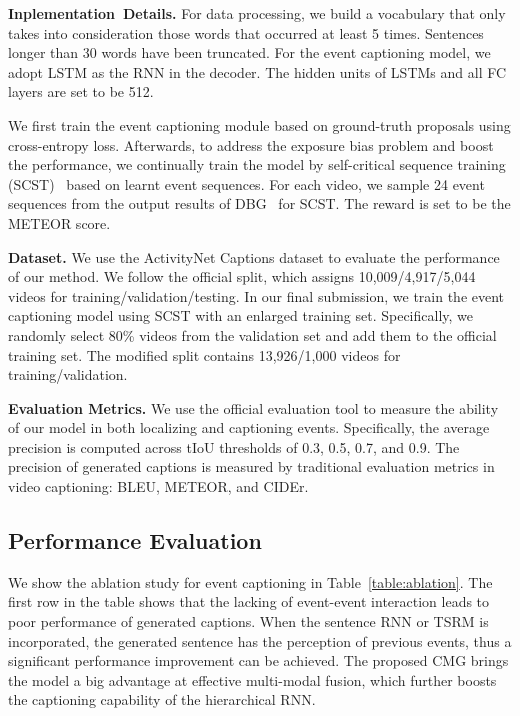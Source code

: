 \documentclass[10pt,twocolumn,letterpaper]{article}
\begin{document}
\textbf{Inplementation\ Details.} For data processing, we build a vocabulary that only takes into consideration those words that occurred at least 5 times. Sentences longer than 30 words have been truncated. For the event captioning model, we adopt LSTM as the RNN in the decoder. The hidden units of LSTMs and all FC layers are set to be 512.

We first train the event captioning module based on ground-truth proposals using cross-entropy loss. Afterwards, to address the exposure bias problem and boost the performance, we continually train the model by self-critical sequence training (SCST)~\cite{Rennie2017self} based on learnt event sequences. For each video, we sample 24 event sequences from the output results of DBG~\cite{lin2019fast} for SCST. The reward is set to be the METEOR score.

\textbf{Dataset.}
We use the ActivityNet Captions dataset to evaluate the performance of our method. We follow the official split, which assigns 10,009/4,917/5,044 videos for training/validation/testing. In our final submission, we train the event captioning model using SCST with an enlarged training set. Specifically, we randomly select 80\% videos from the validation set and add them to the official training set. The modified split contains 13,926/1,000 videos for training/validation.

\textbf{Evaluation Metrics.} We use the official evaluation tool to measure the ability of our model in both localizing and captioning events. Specifically, the average precision is computed across tIoU thresholds of 0.3, 0.5, 0.7, and 0.9. The precision of generated captions is measured by traditional evaluation metrics in video captioning: BLEU, METEOR, and CIDEr.

\subsection{Performance Evaluation}

We show the ablation study for event captioning in Table~\ref{table:ablation}. The first row in the table shows that the lacking of event-event interaction leads to poor performance of generated captions. When the sentence RNN or TSRM is incorporated, the generated sentence has the perception of previous events, thus a significant performance improvement can be achieved. The proposed CMG brings the model a big advantage at effective multi-modal fusion, which further boosts the captioning capability of the hierarchical RNN.
\end{document}
